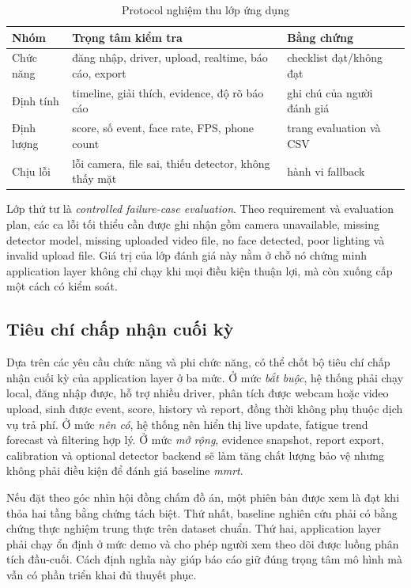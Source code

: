 \documentclass[conference,a4paper]{IEEEtran}
\begin{document}
\begin{table}[t]
\caption{Protocol nghiệm thu lớp ứng dụng}
\label{tab:evaluation-protocol}
\centering
\scriptsize
\begin{tabular}{L{1.45cm}L{2.65cm}L{2.15cm}}
\toprule
Nhóm & Trọng tâm kiểm tra & Bằng chứng \\
\midrule
Chức năng & đăng nhập, driver, upload, realtime, báo cáo, export & checklist đạt/không đạt \\
Định tính & timeline, giải thích, evidence, độ rõ báo cáo & ghi chú của người đánh giá \\
Định lượng & score, số event, face rate, FPS, phone count & trang evaluation và CSV \\
Chịu lỗi & lỗi camera, file sai, thiếu detector, không thấy mặt & hành vi fallback \\
\bottomrule
\end{tabular}
\end{table}

Lớp thứ tư là \textit{controlled failure-case evaluation}. Theo requirement và evaluation plan, các ca lỗi tối thiểu cần được ghi nhận gồm camera unavailable, missing detector model, missing uploaded video file, no face detected, poor lighting và invalid upload file. Giá trị của lớp đánh giá này nằm ở chỗ nó chứng minh application layer không chỉ chạy khi mọi điều kiện thuận lợi, mà còn xuống cấp một cách có kiểm soát.

\subsection{Tiêu chí chấp nhận cuối kỳ}
Dựa trên các yêu cầu chức năng và phi chức năng, có thể chốt bộ tiêu chí chấp nhận cuối kỳ của application layer ở ba mức. Ở mức \textit{bắt buộc}, hệ thống phải chạy local, đăng nhập được, hỗ trợ nhiều driver, phân tích được webcam hoặc video upload, sinh được event, score, history và report, đồng thời không phụ thuộc dịch vụ trả phí. Ở mức \textit{nên có}, hệ thống nên hiển thị live update, fatigue trend forecast và filtering hợp lý. Ở mức \textit{mở rộng}, evidence snapshot, report export, calibration và optional detector backend sẽ làm tăng chất lượng bảo vệ nhưng không phải điều kiện để đánh giá baseline \textit{mmrt}.

Nếu đặt theo góc nhìn hội đồng chấm đồ án, một phiên bản được xem là đạt khi thỏa hai tầng bằng chứng tách biệt. Thứ nhất, baseline nghiên cứu phải có bằng chứng thực nghiệm trung thực trên dataset chuẩn. Thứ hai, application layer phải chạy ổn định ở mức demo và cho phép người xem theo dõi được luồng phân tích đầu-cuối. Cách định nghĩa này giúp báo cáo giữ đúng trọng tâm mô hình mà vẫn có phần triển khai đủ thuyết phục.
\end{document}
